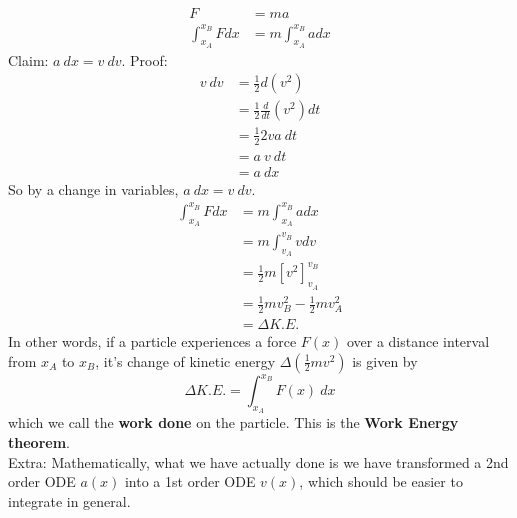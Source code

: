 \documentclass{article}
\begin{document}
\begin{align}
    F &= ma \\
    \int_{x_A}^{x_B} F dx &= m \int_{x_A}^{x_B} a dx 
\end{align}
Claim: $a\ dx = v\ dv$. Proof: 
\begin{align}
v\ dv
& = \frac{1}{2} d\left(v^2\right) \\
& =\frac{1}{2} \frac{d}{d t}\left(v^2\right) d t \\
& =\frac{1}{2} 2 v a\ d t \\
& =a\ v\ d t \\
& =a \ d x
\end{align}
So by a change in variables, $a\ dx = v\ dv$. 
\begin{align}
    \int_{x_A}^{x_B} F dx &= m \int_{x_A}^{x_B} a dx \\
    &= m \int_{v_A}^{v_B} v dv \\
    &= \frac{1}{2} m \left[v^2\right]_{v_A}^{v_B} \\
    &= \frac{1}{2} m v_B^2 - \frac{1}{2} mv_A^2 \\
    &= \Delta K.E.
\end{align}
In other words, if a particle experiences a force $F(x)$ over a distance interval from $x_A$ to $x_B$, it's change of kinetic energy $\Delta\left(\frac{1}{2}mv^2\right)$ is given by $$\Delta K.E. = \int_{x_A}^{x_B} F(x)\ dx$$
which we call the \textbf{work done} on the particle. This is the \textbf{Work Energy theorem}.\\[10pt]
Extra: Mathematically, what we have actually done is we have transformed a 2nd order ODE $a(x)$ into a 1st order ODE $v(x)$, which should be easier to integrate in general.
\end{document}

